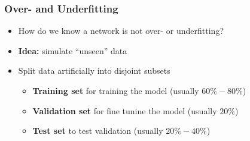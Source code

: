 \documentclass[aspectratio=169]{beamer}
\begin{document}
\begin{frame}
\frametitle{Over- and Underfitting}

\begin{itemize}
    \item How do we know a network is not over- or underfitting?
    \item \textbf{Idea:} simulate ``unseen'' data
    \item Split data artificially into disjoint subsets
    \begin{itemize}
        \item \textbf{Training set} for training the model (usually $60\%-80\%$)
        \item \textbf{Validation set} for fine tunine the model (usually $20\%$)
        \item \textbf{Test set} to test validation (usually $20\%-40\%$)
    \end{itemize}
\end{itemize}
\end{frame}
\end{document}
